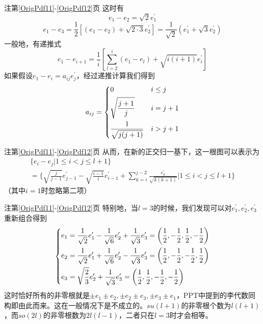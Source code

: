 \documentclass{beamer}
\newcommand{\refpageN}[1]{\ref{OrigPdf#1}}%
\begin{document}
\begin{frame}{注第\refpageN{11}-\refpageN{12}页}
	这时有
	\begin{equation*}
	e_1-e_2=\sqrt{2}e_1^\prime
	\end{equation*}
	\begin{equation*}
	e_1-e_3=\frac{1}{2}[(e_1-e_2)+\sqrt{2\cdot 3}e_2^\prime]=\frac{1}{\sqrt{2}}(e_1^\prime+\sqrt{3}e_2^\prime)
	\end{equation*}
	一般地，有递推式
	\begin{equation*}
	e_1-e_{i+1}=\frac{1}{i}\left[\sum_{l=2}^i (e_1-e_l) + \sqrt{i(i+1)}e_i^\prime\right]
	\end{equation*}
	如果假设$e_1-e_{i}=a_{ij}e_j^\prime$，经过递推计算我们得到
	\begin{equation*}
	a_{ij}=
	\begin{dcases}
	0 & i\leq j \\
	\sqrt{\frac{j+1}{j}} & i = j+1\\
	\frac{1}{\sqrt{j(j+1)}} & i > j+1
	\end{dcases}
	\end{equation*}
\end{frame}

\begin{frame}{注第\refpageN{11}-\refpageN{12}页}
	从而，在新的正交归一基下，这一根图可以表示为
	\begin{multline*}
	\{e_i-e_j|1\leq i < j \leq l+1\}\\=\Bigg\{\sqrt{\frac{j}{j-1}}e_{j-1}^\prime-\sqrt{\frac{i-1}{i}}e_{i-1}^\prime+\sum_{k=i}^{j-2}\frac{e_k^\prime}{\sqrt{k(k+1)}}
	\Bigg|1\leq i < j \leq l+1\Bigg\}
	\end{multline*}
	（其中$i=1$时忽略第二项）
\end{frame}

\begin{frame}{注第\refpageN{11}-\refpageN{12}页}
	特别地，当$l=3$的时候，我们发现可以对$e_1^\prime,e_2^\prime,e_3^\prime$重新组合得到
	\begin{equation*}
	\begin{dcases}
	e_1=\frac{1}{\sqrt{2}}e_1^\prime-\frac{1}{\sqrt{6}}e_2^\prime+\frac{1}{\sqrt{3}}e_3^\prime=\left(\frac12,-\frac12,\frac12,-\frac12\right)\\
	e_2=\frac{1}{\sqrt{2}}e_1^\prime+\frac{1}{\sqrt{6}}e_2^\prime-\frac{1}{\sqrt{3}}e_3^\prime=\left(\frac12,-\frac12,-\frac12,\frac12\right)\\
	e_3=\sqrt{\frac{2}{3}}e_2^\prime+\frac{1}{\sqrt{3}}e_3^\prime=\left(\frac12,\frac12,-\frac12,-\frac12\right)
	\end{dcases}
	\end{equation*}
	这时恰好所有的非零根就是$\pm e_1\pm e_2,\pm e_2\pm e_3,\pm e_3\pm e_1$，PPT中提到的李代数同构即由此而来。这在一般情况下是不成立的。$su(l+1)$的非零根个数为$l(l+1)$，而$so(2l)$的非零根数为$2l(l-1)$，二者只在$l=3$时才会相等。
\end{frame}
\end{document}
